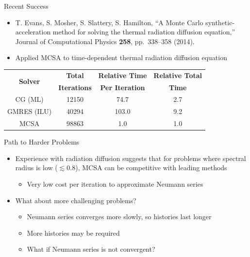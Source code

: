 \documentclass{beamer}
\begin{document}
\begin{frame}{Recent Success}
\begin{itemize}
  \item T. Evans, S. Mosher, S. Slattery, S. Hamilton, ``A Monte Carlo
    synthetic-acceleration method for solving the thermal radiation diffusion
    equation,'' Journal of Computational Physics \textbf{258},
    pp.~338--358 (2014).
  \item Applied MCSA to time-dependent thermal radiation diffusion equation
\end{itemize}
\begin{table}
  \centering
  \begin{tabular}{cccc}
    \toprule
    \multirow{2}{*}{\bfseries Solver} &
    \bfseries Total &
    \bfseries Relative Time &
    \bfseries Relative Total \\
    & \bfseries Iterations &
    \bfseries Per Iteration &
    \bfseries Time \\
    \midrule
    CG (ML) & 12150 & 74.7 & 2.7 \\
    GMRES (ILU) & 40294 & 103.0 & 9.2 \\
    MCSA & 98863 & 1.0 & 1.0 \\
    \bottomrule
  \end{tabular}
\end{table}
\end{frame}
\begin{frame}{Path to Harder Problems}
  \begin{itemize}
    \item Experience with radiation diffusion suggests that for problems
      where spectral radius is low ($\lesssim 0.8$),
      MCSA can be competitive with leading methods
      \begin{itemize}
        \item Very low cost per iteration to approximate Neumann series
      \end{itemize}
    \vfill
    \item What about more challenging problems?
      \begin{itemize}
        \item Neumann series converges more slowly, so histories last longer
        \item More histories may be required
        \item What if Neumann series is not convergent?
      \end{itemize}
  \end{itemize}
\end{frame}
\end{document}

